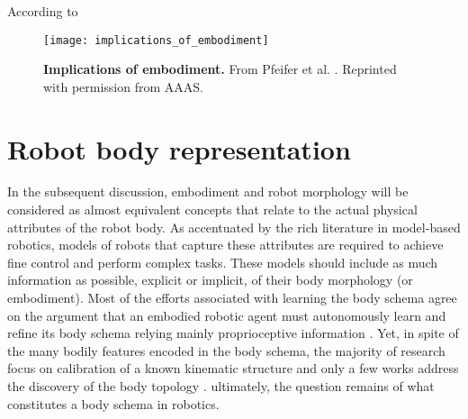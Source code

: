 \subsubsection{}
\TODO
According to \cite{LungarellaEmbodimentInformationCausal}






\begin{figure}
	\begin{center}
		\texttt{[image: implications\_of\_embodiment]}
		\caption{\textbf{Implications of embodiment.} From Pfeifer et al. \cite{Pfeifer2007SelfOrganizationEmbodiment}. Reprinted with permission from AAAS.}
	\end{center}
\end{figure}

\section{Robot body representation}
In the subsequent discussion, embodiment and robot morphology will be considered as almost equivalent concepts that relate to the actual physical attributes of the robot body. As accentuated by the rich literature in model-based robotics, models of robots that capture these attributes are required to achieve fine control and perform complex tasks. These models should include as much information as possible, explicit or implicit, of their body morphology (or embodiment). Most of the efforts associated with learning the body schema agree on the argument that an embodied robotic agent must autonomously learn and refine its body schema relying mainly proprioceptive information \cite{Morasso2015Revisitingbodyschema, Hoffmann2010Bodyschemarobotics}. Yet, in spite of the many bodily features encoded in the body schema, the majority of research focus on calibration of a known kinematic structure  and only a few works address the discovery of the body topology .  ultimately, the question remains of what constitutes a body schema in robotics. 

